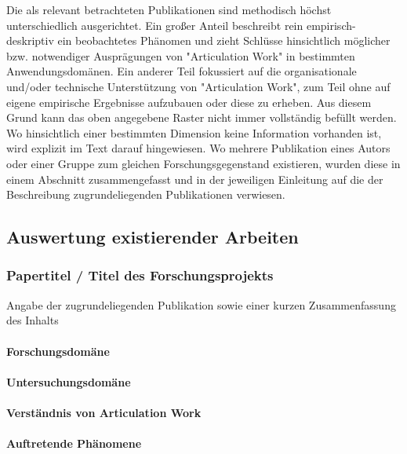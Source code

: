 Die als relevant betrachteten Publikationen sind methodisch höchst unterschiedlich ausgerichtet. Ein großer Anteil beschreibt rein empirisch-deskriptiv ein beobachtetes Phänomen und zieht Schlüsse hinsichtlich möglicher bzw. notwendiger Ausprägungen von "Articulation Work" in bestimmten Anwendungsdomänen. Ein anderer Teil fokussiert auf die organisationale und/oder technische Unterstützung von "Articulation Work", zum Teil ohne auf eigene empirische Ergebnisse aufzubauen oder diese zu erheben. Aus diesem Grund kann das oben angegebene Raster nicht immer vollständig befüllt werden. Wo hinsichtlich einer bestimmten Dimension keine Information vorhanden ist, wird explizit im Text darauf hingewiesen. Wo mehrere Publikation eines Autors oder einer Gruppe zum gleichen Forschungsgegenstand existieren, wurden diese in einem Abschnitt zusammengefasst und in der jeweiligen Einleitung auf die der Beschreibung zugrundeliegenden Publikationen verwiesen.

\subsection{Auswertung existierender Arbeiten} %
\label{sub:auswertung_existierender_arbeiten}

\subsubsection{Papertitel / Titel des Forschungsprojekts}

Angabe der zugrundeliegenden Publikation sowie einer kurzen Zusammenfassung des Inhalts

\paragraph{Forschungsdomäne}

\paragraph{Untersuchungsdomäne}

\paragraph{Verständnis von Articulation Work}

\paragraph{Auftretende Phänomene}

